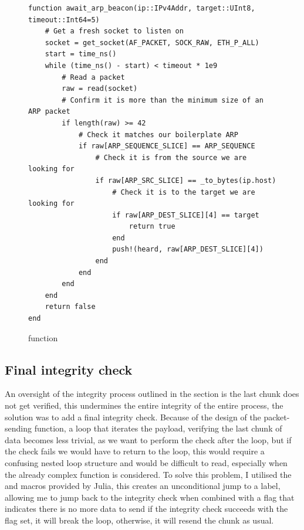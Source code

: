 \begin{figure}[h]
\begin{lstlisting}[language=JuliaLocal, style=julia]
    function await_arp_beacon(ip::IPv4Addr, target::UInt8, timeout::Int64=5)
    # Get a fresh socket to listen on
    socket = get_socket(AF_PACKET, SOCK_RAW, ETH_P_ALL)
    start = time_ns()
    while (time_ns() - start) < timeout * 1e9
        # Read a packet
        raw = read(socket)
        # Confirm it is more than the minimum size of an ARP packet
        if length(raw) >= 42
            # Check it matches our boilerplate ARP
            if raw[ARP_SEQUENCE_SLICE] == ARP_SEQUENCE
                # Check it is from the source we are looking for
                if raw[ARP_SRC_SLICE] == _to_bytes(ip.host)
                    # Check it is to the target we are looking for
                    if raw[ARP_DEST_SLICE][4] == target
                        return true
                    end
                    push!(heard, raw[ARP_DEST_SLICE][4])
                end
            end
        end
    end
    return false
end
\end{lstlisting}
\caption{ function}
\label{fig:await_arp_beacon}
\end{figure}

\subsection{Final integrity check}

An oversight of the integrity process outlined in the  section is the last chunk does not get verified, this undermines the entire integrity of the entire process, the solution was to add a final integrity check. Because of the design of the packet-sending function, a loop that iterates the payload, verifying the last chunk of data becomes less trivial, as we want to perform the check after the loop, but if the check fails we would have to return to the loop, this would require a confusing nested loop structure and would be difficult to read, especially when the already complex function is considered. To solve this problem, I utilised the  and  macros provided by Julia, this creates an unconditional jump to a label, allowing me to jump back to the integrity check when combined with a flag  that indicates there is no more data to send if the integrity check succeeds with the flag set, it will break the loop, otherwise, it will resend the chunk as usual.

